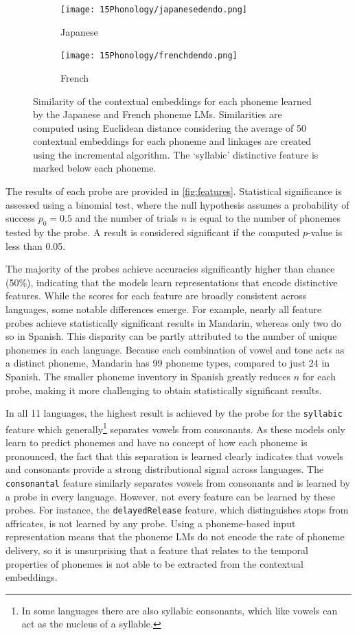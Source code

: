 \begin{figure}[t]
    \centering
    \begin{subfigure}{0.49\textwidth}
        \texttt{[image: 15Phonology/japanesedendo.png]}
        \caption{Japanese}
    \end{subfigure}
    \begin{subfigure}{0.49\textwidth}
        \texttt{[image: 15Phonology/frenchdendo.png]}
        \caption{French}
    \end{subfigure}
    \caption{Similarity of the contextual embeddings for each phoneme learned by the Japanese and French phoneme LMs. Similarities are computed using Euclidean distance considering the average of 50 contextual embeddings for each phoneme and linkages are created using the incremental algorithm. The `syllabic' distinctive feature is marked below each phoneme.} 
    \label{fig:dendrogram}
\end{figure}

The results of each probe are provided in \cref{fig:features}. Statistical significance is assessed using a binomial test, where the null hypothesis assumes a probability of success \( p_0 = 0.5 \) and the number of trials \( n \) is equal to the number of phonemes tested by the probe. A result is considered significant if the computed \( p \)-value is less than 0.05.

The majority of the probes achieve accuracies significantly higher than chance (50\%), indicating that the models learn representations that encode distinctive features. While the scores for each feature are broadly consistent across languages, some notable differences emerge. For example, nearly all feature probes achieve statistically significant results in Mandarin, whereas only two do so in Spanish. This disparity can be partly attributed to the number of unique phonemes in each language. Because each combination of vowel and tone acts as a distinct phoneme, Mandarin has 99 phoneme types, compared to just 24 in Spanish. The smaller phoneme inventory in Spanish greatly reduces $n$ for each probe, making it more challenging to obtain statistically significant results.

In all 11 languages, the highest result is achieved by the probe for the \texttt{syllabic} feature which generally\footnote{In some languages there are also syllabic consonants, which like vowels can act as the nucleus of a syllable.} separates vowels from consonants. As these models only learn to predict phonemes and have no concept of how each phoneme is pronounced, the fact that this separation is learned clearly indicates that vowels and consonants provide a strong distributional signal across languages. The \texttt{consonantal} feature similarly separates vowels from consonants and is learned by a probe in every language. However, not every feature can be learned by these probes. For instance, the \texttt{delayedRelease} feature, which distinguishes stops from affricates, is not learned by any probe. Using a phoneme-based input representation means that the phoneme LMs do not encode the rate of phoneme delivery, so it is unsurprising that a feature that relates to the temporal properties of phonemes is not able to be extracted from the contextual embeddings.

